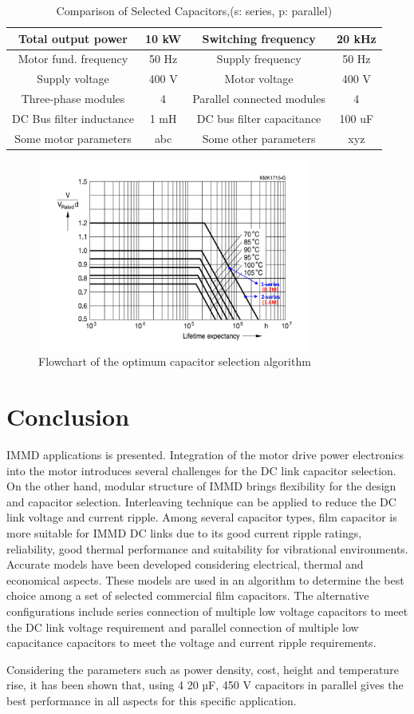\documentclass[conference,a4paper,twocolumn]{IEEEtran}
\begin{document}
\begin{table}[h]
\renewcommand{\arraystretch}{1.4}
\caption{Comparison of Selected Capacitors,(s: series, p: parallel)}
\label{table3}
\centering
\begin{tabular}{|c|c|c|c|}
\hline
Total output power & 10 kW & Switching frequency & 20 kHz\\
\hline
Motor fund. frequency & 50 Hz & Supply frequency & 50 Hz\\
\hline
Supply voltage & 400 V & Motor voltage & 400 V\\
\hline
Three-phase modules & 4 & Parallel connected modules & 4\\
\hline
DC Bus filter inductance & 1 mH & DC bus filter capacitance & 100 uF\\
\hline
Some motor parameters & abc & Some other parameters & xyz\\
\hline
\end{tabular}
\end{table}

\begin{figure}[h]
  \centering
  \includegraphics[width=9cm]{lifetime}
  \caption{Flowchart of the optimum capacitor selection algorithm}
  \label{lifetime}
\end{figure}


\section{Conclusion}

IMMD applications is presented. Integration of the motor drive power electronics into the motor introduces several challenges for the DC link capacitor selection. On the other hand, modular structure of IMMD brings flexibility for the design and capacitor selection. Interleaving technique can be applied to reduce the DC link voltage and current ripple. Among several capacitor types, film capacitor is more suitable for IMMD DC links due to its good current ripple ratings, reliability, good thermal performance and suitability for vibrational environments. Accurate models have been developed considering electrical, thermal and economical aspects. These models are used in an algorithm to determine the best choice among a set of selected commercial film capacitors. The alternative configurations include series connection of multiple low voltage capacitors to meet the DC link voltage requirement and parallel connection of multiple low capacitance capacitors to meet the voltage and current ripple requirements.

Considering the parameters such as power density, cost, height and temperature rise, it has been shown that, using 4 20 µF, 450 V capacitors in parallel gives the best performance in all aspects for this specific application.




\end{document}
